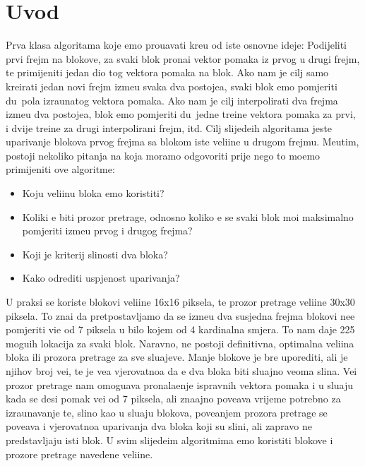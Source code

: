 \section{Uvod}
Prva klasa algoritama koje \cj emo prou\ch avati kre\cj u od iste osnovne ideje: Podijeliti prvi frejm na blokove, za svaki blok prona\cj i vektor pomaka iz prvog u drugi frejm, te primijeniti jedan dio tog vektora pomaka na blok.
Ako nam je cilj samo kreirati jedan novi frejm izme\dj u svaka dva postoje\cj a, svaki blok \cj emo pomjeriti du\zh\ pola izra\ch unatog vektora pomaka. Ako nam je cilj interpolirati dva frejma izme\dj u dva postoje\cj a, blok \cj emo 
pomjeriti du\zh\ jedne tre\cj ine vektora pomaka za prvi, i dvije tre\cj ine za drugi interpolirani frejm, itd. Cilj slijede\cj ih algoritama jeste uparivanje blokova prvog frejma sa blokom iste veli\ch ine u drugom frejmu. Me\dj utim,
postoji nekoliko pitanja na koja moramo odgovoriti prije nego \sh to mo\zh emo primijeniti ove algoritme:

\begin{itemize}
	\item Koju veli\ch inu bloka \cj emo koristiti?
	\item Koliki \cj e biti prozor pretrage, odnosno koliko \cj e se svaki blok mo\cj i maksimalno pomjeriti izme\dj u prvog i drugog frejma?
	\item Koji je kriterij sli\ch nosti dva bloka?
	\item Kako odrediti uspje\sh nost uparivanja?
\end{itemize}

U praksi se koriste blokovi veli\ch ine 16x16 piksela, te prozor pretrage veli\ch ine 30x30 piksela. To zna\ch i da pretpostavljamo da se izme\dj u dva susjedna frejma blokovi ne\cj e pomjeriti vi\sh e od 7 piksela u bilo kojem od 4
kardinalna smjera. To nam daje 225 mogu\cj ih lokacija za svaki blok. Naravno, ne postoji definitivna, optimalna veli\ch ina bloka ili prozora pretrage za sve slu\ch ajeve. Manje blokove je br\zh e uporediti, ali je njihov broj ve\cj i,
te je ve\cj a vjerovatno\cj a da \cj e dva bloka biti slu\ch ajno veoma sli\ch na. Ve\cj i prozor pretrage nam omogu\cj ava pronala\zh enje ispravnih vektora pomaka i u slu\ch aju kada se desi pomak ve\cj i od 7 piksela, ali
zna\ch ajno pove\cj ava vrijeme potrebno za izra\ch unavanje te, sli\ch no kao u slu\ch aju blokova, pove\cj anjem prozora pretrage se pove\cj ava i vjerovatno\cj a uparivanja dva bloka koji su sli\ch ni, ali zapravo ne
predstavljaju isti blok. U svim slijede\cj im algoritmima \cj emo koristiti blokove i prozore pretrage navedene veli\ch ine.

